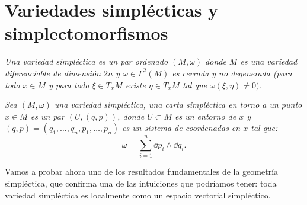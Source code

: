 \section{Variedades simplécticas y simplectomorfismos}\label{sec:variedades}
\begin{defn}
  \em
  Una \emph{variedad simpléctica} es un par ordenado $(M,\omega)$ donde $M$ es una variedad diferenciable de dimensión $2n$ y $\omega \in \Gamma^2(M)$ es cerrada y no degenerada (para todo $x \in M$ y para todo $\xi \in T_xM$ existe $\eta \in T_xM$ tal que $\omega(\xi,\eta)\neq0)$. 
\end{defn}
\begin{defn}
  \em
  Sea $(M,\omega)$ una variedad simpléctica, una \emph{carta simpléctica en torno a un punto $x \in M$} es un par $(U,(q,p))$, donde $U\subset M$ es un entorno de $x$ y $(q,p)=(q_1,\dots,q_n,p_1,\dots,p_n)$ es un sistema de coordenadas en $x$ tal que:
\begin{equation}
  \omega= \sum_{i=1}^n \dd p_i \wedge \dd q_i.
  \label{forma}
\end{equation}
\end{defn}

Vamos a probar ahora uno de los resultados fundamentales de la geometría simpléctica, que confirma una de las intuiciones que podríamos tener: toda variedad simpléctica es localmente como un espacio vectorial simpléctico.

